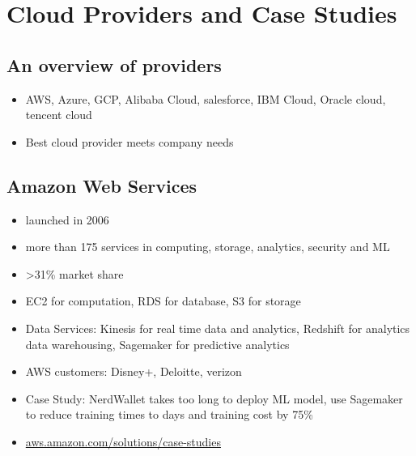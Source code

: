 \section{Cloud Providers and Case Studies}
\subsection{An overview of providers}
\begin{itemize}
    \item AWS, Azure, GCP, Alibaba Cloud, salesforce, IBM Cloud, Oracle cloud, tencent cloud
    \item Best cloud provider meets company needs
\end{itemize}

\subsection{Amazon Web Services}
\begin{itemize}
    \item launched in 2006
    \item more than 175 services in computing, storage, analytics, security and ML
    \item \textgreater 31\% market share
    \item EC2 for computation, RDS for database, S3 for storage
    \item Data Services: Kinesis for real time data and analytics, Redshift for analytics data warehousing, Sagemaker for predictive analytics
    \item AWS customers: Disney+, Deloitte, verizon
    \item Case Study: NerdWallet takes too long to deploy ML model, use Sagemaker to reduce training times to days and training cost by 75\%
    \item \url{aws.amazon.com/solutions/case-studies}
\end{itemize}

